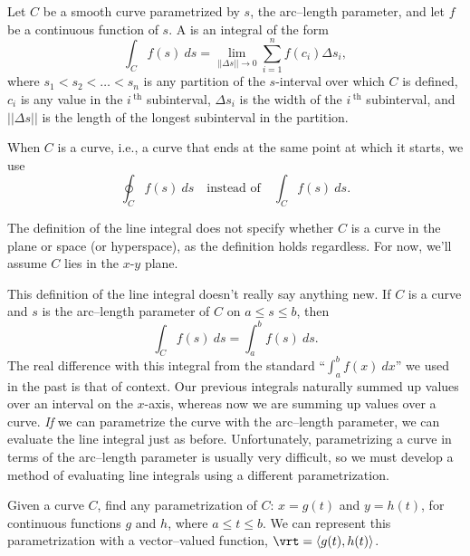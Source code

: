 {Let $C$ be a smooth curve parametrized by $s$, the arc--length parameter, and let $f$ be a continuous function of $s$. A  is an integral of the form
$$\int_C f(s)\ ds = \lim_{||\Delta s||\to 0}\sum_{i=1}^n f(c_i)\Delta s_i,$$
where $s_1<s_2<\ldots<s_n$ is any partition of the $s$-interval over which $C$ is defined, $c_i$ is any value in the $i\,^\text{th}$ subinterval,  $\Delta s_i$ is the width of the $i\,^\text{th}$ subinterval, and $||\Delta s||$ is the length of the longest subinterval in the partition.
}




When $C$ is a  curve, i.e., a curve that ends at the same point at which it starts,  we use $$\oint_C f(s)\ ds \quad \text{instead of}\quad \int_Cf(s)\ ds.$$

The definition of the line integral does not specify whether $C$ is a curve in the plane or space (or hyperspace), as the definition holds regardless. For now, we'll assume $C$ lies in the $x$-$y$ plane.

This definition of the line integral  doesn't really say anything new. If $C$ is a curve and $s$ is the arc--length parameter of $C$ on $a\leq s\leq b$, then 
$$\int_Cf(s)\ ds = \int_a^bf(s)\ ds.$$
The real difference with this integral from the standard ``$\int_a^bf(x)\ dx$'' we used in the past is that of context. Our previous integrals naturally summed up values over an interval on the $x$-axis, whereas now we are summing up values over a curve. \emph{If} we can parametrize the curve with the arc--length parameter, we can evaluate the line integral just as before. Unfortunately, parametrizing a curve in terms of the arc--length parameter is usually very difficult, so we must develop a method of evaluating line integrals using a different parametrization.


Given a curve $C$, find any parametrization of $C$: $x = g(t)$ and $y=h(t)$, for continuous functions $g$ and $h$, where $a\leq t\leq b$. We can represent this parametrization with a vector--valued function, $\vrt = \langle g(t),h(t)\rangle$.

